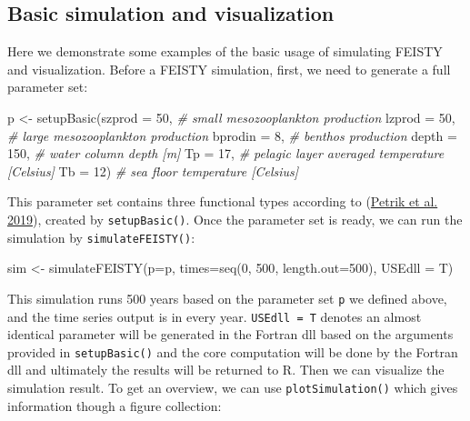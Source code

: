 \documentclass[
]{article}
\newenvironment{Shaded}{\begin{snugshade}}{\end{snugshade}}
\newcommand{\AttributeTok}[1]{\textcolor[rgb]{0.77,0.63,0.00}{#1}}
\newcommand{\CommentTok}[1]{\textcolor[rgb]{0.56,0.35,0.01}{\textit{#1}}}
\newcommand{\DecValTok}[1]{\textcolor[rgb]{0.00,0.00,0.81}{#1}}
\newcommand{\FunctionTok}[1]{\textcolor[rgb]{0.00,0.00,0.00}{#1}}
\newcommand{\NormalTok}[1]{#1}
\newcommand{\OtherTok}[1]{\textcolor[rgb]{0.56,0.35,0.01}{#1}}
\begin{document}
\hypertarget{basic-simulation-and-visualization}{%
\subsection{Basic simulation and
visualization}\label{basic-simulation-and-visualization}}

Here we demonstrate some examples of the basic usage of simulating
FEISTY and visualization. Before a FEISTY simulation, first, we need to
generate a full parameter set:

\begin{Shaded}
\begin{Highlighting}[]
\NormalTok{p }\OtherTok{\textless{}{-}} \FunctionTok{setupBasic}\NormalTok{(}\AttributeTok{szprod =} \DecValTok{50}\NormalTok{,   }\CommentTok{\# small mesozooplankton production}
                \AttributeTok{lzprod =} \DecValTok{50}\NormalTok{,   }\CommentTok{\# large mesozooplankton production}
                \AttributeTok{bprodin  =} \DecValTok{8}\NormalTok{,  }\CommentTok{\# benthos production}
                \AttributeTok{depth  =} \DecValTok{150}\NormalTok{,  }\CommentTok{\# water column depth [m]}
                \AttributeTok{Tp     =} \DecValTok{17}\NormalTok{,   }\CommentTok{\# pelagic layer averaged temperature [Celsius]}
                \AttributeTok{Tb     =} \DecValTok{12}\NormalTok{)   }\CommentTok{\# sea floor temperature [Celsius]}
\end{Highlighting}
\end{Shaded}

This parameter set contains three functional types according to
(\protect\hyperlink{ref-petrik2019bottom}{Petrik et al. 2019}), created
by \texttt{setupBasic()}. Once the parameter set is ready, we can run
the simulation by \texttt{simulateFEISTY()}:

\begin{Shaded}
\begin{Highlighting}[]
\NormalTok{sim }\OtherTok{\textless{}{-}} \FunctionTok{simulateFEISTY}\NormalTok{(}\AttributeTok{p=}\NormalTok{p,  }\AttributeTok{times=}\FunctionTok{seq}\NormalTok{(}\DecValTok{0}\NormalTok{, }\DecValTok{500}\NormalTok{, }\AttributeTok{length.out=}\DecValTok{500}\NormalTok{), }\AttributeTok{USEdll =}\NormalTok{ T)}
\end{Highlighting}
\end{Shaded}

This simulation runs 500 years based on the parameter set \texttt{p} we
defined above, and the time series output is in every year.
\texttt{USEdll\ =\ T} denotes an almost identical parameter will be
generated in the Fortran dll based on the arguments provided in
\texttt{setupBasic()} and the core computation will be done by the
Fortran dll and ultimately the results will be returned to R. Then we
can visualize the simulation result. To get an overview, we can use
\texttt{plotSimulation()} which gives information though a figure
collection:
\end{document}
